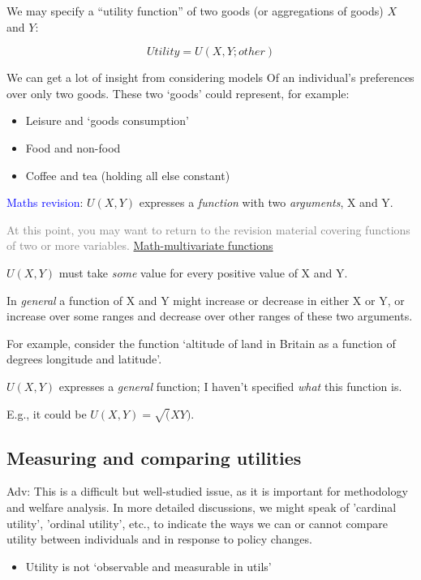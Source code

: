 \documentclass[]{article}
\providecommand{\tightlist}{%
  \setlength{\itemsep}{0pt}\setlength{\parskip}{0pt}}
\begin{document}
We may specify a ``utility function'' of two goods (or aggregations of
goods) \(X\) and \(Y\):

\[Utility = U(X,Y; other)\]

We can get a lot of insight from considering models Of an individual's
preferences over only two goods. These two `goods' could represent, for
example:

\begin{itemize}
\item
  Leisure and `goods consumption'
\item
  Food and non-food
\item
  Coffee and tea (holding all else constant)
\end{itemize}

\textcolor{blue}{Maths revision}: \(U(X,Y)\) expresses a \emph{function}
with two \emph{arguments}, X and Y.

\textcolor{gray}{At this point, you may want to return to the revision material covering functions of two or more variables.}
\protect\hyperlink{multivar-functions}{Math-multivariate functions}

\(U(X,Y)\) must take \emph{some} value for every positive value of X and
Y.

In \emph{general} a function of X and Y might increase or decrease in
either X or Y, or increase over some ranges and decrease over other
ranges of these two arguments.

For example, consider the function `altitude of land in Britain as a
function of degrees longitude and latitude'.

\(U(X,Y)\) expresses a \emph{general} function; I haven't specified
\emph{what} this function is.

E.g., it could be \(U(X,Y)=\sqrt(XY)\).

\hypertarget{measuring-and-comparing-utilities}{%
\subsection{Measuring and comparing
utilities}\label{measuring-and-comparing-utilities}}

\textcolor{RawSienna}{Adv: This is a difficult but well-studied issue, as it is important for methodology and welfare analysis. In more detailed discussions, we might speak of 'cardinal utility', 'ordinal utility', etc.,  to indicate the ways we can or cannot compare utility between individuals and in response to policy changes.}

\begin{itemize}
\tightlist
\item
  Utility is not `observable and measurable in utils'
\end{itemize}
\end{document}
